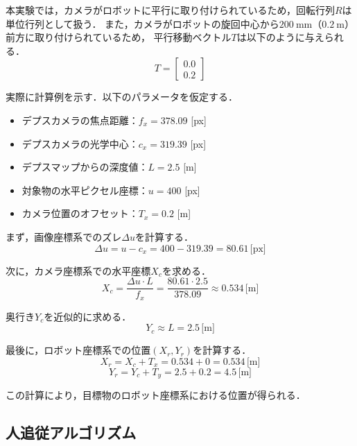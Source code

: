 本実験では，カメラがロボットに平行に取り付けられているため，回転行列$R$は単位行列として扱う．
また，カメラがロボットの旋回中心から$200\ \mathrm{mm}$（$0.2\ \mathrm{m}$）前方に取り付けられているため，
平行移動ベクトル$T$は以下のように与えられる．
\begin{equation}
    T = \begin{bmatrix} 0.0 \\ 0.2 \end{bmatrix}
\end{equation}

実際に計算例を示す．以下のパラメータを仮定する．
\begin{itemize}
    \item デプスカメラの焦点距離：$f_x = 378.09$ [px]
    \item デプスカメラの光学中心：$c_x = 319.39$ [px]
    \item デプスマップからの深度値：$L = 2.5$ [m]
    \item 対象物の水平ピクセル座標：$u = 400$ [px]
    \item カメラ位置のオフセット：$T_x = 0.2$ [m]
\end{itemize}

まず，画像座標系でのズレ$\Delta u$を計算する．
\begin{equation}
    \Delta u = u - c_x = 400 - 319.39 = 80.61 \, \text{[px]}
\end{equation}

次に，カメラ座標系での水平座標$X_c$を求める．
\begin{equation}
    X_c = \frac{\Delta u \cdot L}{f_x} = \frac{80.61 \cdot 2.5}{378.09} \approx 0.534 \, \text{[m]}
\end{equation}

奥行き$Y_c$を近似的に求める．
\begin{equation}
    Y_c \approx L = 2.5 \, \text{[m]}
\end{equation}

最後に，ロボット座標系での位置$(X_r, Y_r)$を計算する．
\begin{equation}
    X_r = X_c + T_x = 0.534 +0 = 0.534 \, \text{[m]}
\end{equation}
\begin{equation}
    Y_r = Y_c + T_y = 2.5 + 0.2 = 4.5 \, \text{[m]}
\end{equation}

この計算により，目標物のロボット座標系における位置が得られる．

\subsection{人追従アルゴリズム}

